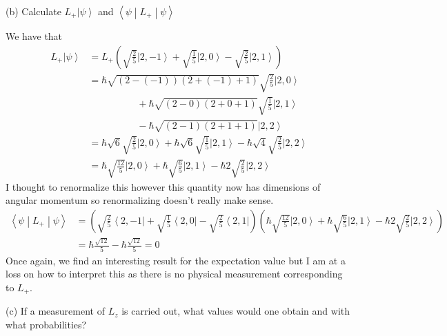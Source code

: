 \documentclass[a4paper, 11pt]{article}
\newcommand{\bra}[1]{\ensuremath{\left\langle#1\right|}}
\newcommand{\ket}[1]{\ensuremath{\left|#1\right\rangle}}
\newcommand{\matrixel}[3]{\ensuremath{\left\langle #1 \middle| #2 \middle| #3 \right\rangle}}
\newenvironment{solution}{%
	\begin{list}{}{%
			\setlength{\topsep}{0pt}%
			\setlength{\leftmargin}{1.5cm}%
			\setlength{\rightmargin}{1.5cm}%
			\setlength{\listparindent}{\parindent}%
			\setlength{\itemindent}{\parindent}%
			\setlength{\parsep}{\parskip}%
		}%
		\item[]}{\end{list}}
\begin{document}
\noindent (b) Calculate $L_+\ket{\psi}$ and $\matrixel{\psi}{L_+}{\psi}$\\
\begin{solution}
  \noindent We have that
  \begin{align*}
    L_+\ket{\psi} &= L_+\left( \sqrt{\frac{2}{5}}\ket{2,-1} + \sqrt{\frac{1}{5}}\ket{2,0}-\sqrt{\frac{2}{5}}\ket{2,1}\right) \\
    &= \hbar\sqrt{(2-(-1))(2+(-1)+1)}\sqrt{\frac{2}{5}}\ket{2,0}\\
    &\hspace{5em}+\hbar\sqrt{(2-0)(2+0+1)}\sqrt{\frac{1}{5}}\ket{2,1}\\
    &\hspace{5em}-\hbar\sqrt{(2-1)(2+1+1)}\ket{2,2} \\
    &= \hbar\sqrt{6}\sqrt{\frac{2}{5}}\ket{2,0}+\hbar\sqrt{6}\sqrt{\frac{1}{5}}\ket{2,1}-\hbar\sqrt{4}\sqrt{\frac{2}{5}}\ket{2,2} \\
    &= \hbar\sqrt{\frac{12}{5}}\ket{2,0}+\hbar\sqrt{\frac{6}{5}}\ket{2,1}-\hbar 2\sqrt{\frac{2}{5}}\ket{2,2} 
  \end{align*}
  I thought to renormalize this however this quantity now has dimensions of angular momentum so renormalizing doesn't really make sense. \\

  \begin{align*}
    \matrixel{\psi}{L_+}{\psi} &= \left(\sqrt{\frac{2}{5}}\bra{2,-1}+\sqrt{\frac{1}{5}}\bra{2,0}-\sqrt{\frac{2}{5}}\bra{2,1} \right)\left(  \hbar\sqrt{\frac{12}{5}}\ket{2,0}+\hbar\sqrt{\frac{6}{5}}\ket{2,1}-\hbar 2\sqrt{\frac{2}{5}}\ket{2,2} \right)\\
    &= \hbar\frac{\sqrt{12}}{5}-\hbar\frac{\sqrt{12} }{5} = 0 
  \end{align*}
  Once again, we find an interesting result for the expectation value but I am at a loss on how to interpret this as there is no physical measurement corresponding to $L_+$. \\ 
\end{solution}


\noindent (c) If a measurement of $L_z$ is carried out, what values would one obtain and with what probabilities?\\
\end{document}
